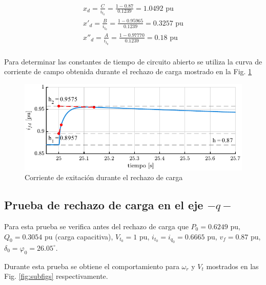 \documentclass[conference]{IEEEtran}
\begin{document}
\begin{gather*}
x_d = \frac{C}{i_{t_0}} = \frac{1 - 0.87}{0.1239} = 1.0492\text{ pu} \\
x'_{d} = \frac{B}{i_{t_0}} = \frac{1 - 0.95965}{0.1239} = 0.3257\text{ pu}\\
x''_{d} = \frac{A}{i_{t_0}} = \frac{1 - 0.97770}{0.1239} = 0.18\text{ pu}\\
\end{gather*}

Para determinar las constantes de tiempo de circuito abierto se utiliza la curva de corriente de campo
obtenida durante el rechazo de carga mostrado en la Fig. \ref{fig:fig2}

\begin{figure}[H]
    \centering
    \includegraphics[width=\linewidth]{Fig/fig2.pdf}
    \caption{Corriente de exitación durante el rechazo de carga}
    \label{fig:fig2}
\end{figure}

\subsection{Prueba de rechazo de carga en el eje $-q-$}

Para esta prueba se verifica antes del rechazo de carga que $P_0 = 0.6249\text{ pu}$, $Q_0 = 0.3054\text{ pu}$ (carga
capacitiva), $V_{t_0} = 1\text{ pu}$, $i_{t_0} = i_{q_0} = 0.6665\text{ pu}$, $v_f = 0.87\text{ pu}$, $\delta_0 = \varphi_0 = 26.05^{\circ}$.


Durante esta prueba se obtiene el comportamiento para $\omega_r$ y $V_t$ mostrados en las Fig. \ref{fig:subfigs} respectivamente.
\end{document}
